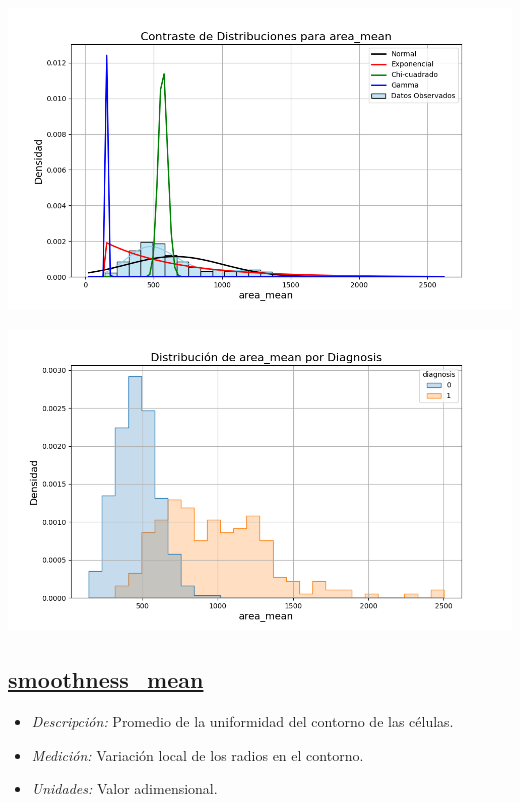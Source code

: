 \documentclass[a4paper, 12pt]{article}
\begin{document}
\includegraphics[width=\textwidth]{../Plots/plots_stats/area_mean/distribuciones_conocidas_area_mean.png}

\includegraphics[width=\textwidth]{../Plots/plots_diagnosis/distribucion_area_mean_por_diagnosis.png}

\subsection*{\underline{smoothness\_mean}}

 \begin{itemize}
	\item \textit{Descripción:} Promedio de la uniformidad del contorno de las células.
	\item \textit{Medición:} Variación local de los radios en el contorno.
	\item \textit{Unidades:} Valor adimensional.
\end{itemize}
\end{document}
